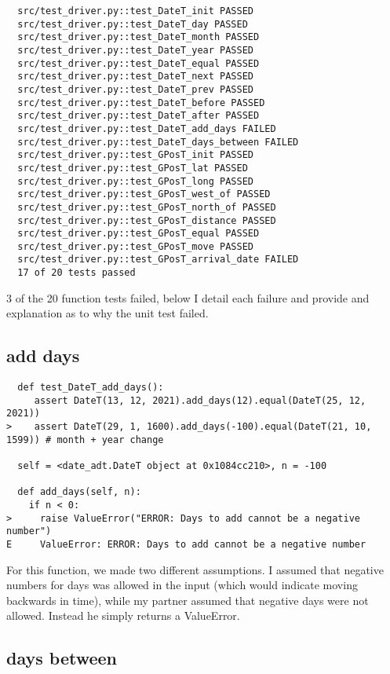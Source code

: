 \documentclass[12pt]{article}
\begin{document}
\begin{lstlisting}
  src/test_driver.py::test_DateT_init PASSED
  src/test_driver.py::test_DateT_day PASSED
  src/test_driver.py::test_DateT_month PASSED
  src/test_driver.py::test_DateT_year PASSED
  src/test_driver.py::test_DateT_equal PASSED
  src/test_driver.py::test_DateT_next PASSED
  src/test_driver.py::test_DateT_prev PASSED
  src/test_driver.py::test_DateT_before PASSED
  src/test_driver.py::test_DateT_after PASSED
  src/test_driver.py::test_DateT_add_days FAILED
  src/test_driver.py::test_DateT_days_between FAILED
  src/test_driver.py::test_GPosT_init PASSED
  src/test_driver.py::test_GPosT_lat PASSED
  src/test_driver.py::test_GPosT_long PASSED
  src/test_driver.py::test_GPosT_west_of PASSED
  src/test_driver.py::test_GPosT_north_of PASSED
  src/test_driver.py::test_GPosT_distance PASSED
  src/test_driver.py::test_GPosT_equal PASSED
  src/test_driver.py::test_GPosT_move PASSED
  src/test_driver.py::test_GPosT_arrival_date FAILED
  17 of 20 tests passed 
\end{lstlisting}

3 of the 20 function tests failed, below I detail each failure and provide and explanation as to why the unit test failed.

\subsection{add days}

\begin{lstlisting}
  def test_DateT_add_days():
     assert DateT(13, 12, 2021).add_days(12).equal(DateT(25, 12, 2021))
>    assert DateT(29, 1, 1600).add_days(-100).equal(DateT(21, 10, 1599)) # month + year change

  self = <date_adt.DateT object at 0x1084cc210>, n = -100

  def add_days(self, n):
    if n < 0:
>     raise ValueError("ERROR: Days to add cannot be a negative number")
E     ValueError: ERROR: Days to add cannot be a negative number
\end{lstlisting}

For this function, we made two different assumptions. I assumed that negative numbers for days was allowed in the input (which would indicate moving backwards in time), while my partner assumed that negative days were not allowed. Instead he simply returns a ValueError.
\\

\subsection{days between}
\end{document}
